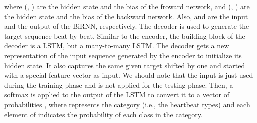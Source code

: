 \documentclass{article}
\begin{document}
where (, ) are the hidden state and the bias of the froward network, and (, ) are the hidden state and the bias of the backward network. Also,  and  are the input and the output of the BiRNN, respectively.
The decoder is used to generate the target sequence beat by beat. Similar to the encoder, the building block of the decoder is a LSTM, but a many-to-many LSTM. The decoder gets a new representation of the input sequence generated by the encoder to initialize its hidden state. It also captures the same given target shifted by one and started with a special feature vector  as input. We should note that the input is just used during the training phase and is not applied for the testing phase. Then, a softmax is applied to the output of the LSTM to convert it to a vector of probabilities , where  represents the category (i.e., the heartbeat types) and each element of  indicates the probability of each class in the category.
\end{document}
